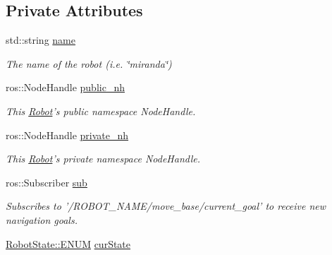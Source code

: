 \subsection*{Private Attributes}
\begin{DoxyCompactItemize}
\item 
\hypertarget{classRobot_ae11f12fef20c4252161c6b774a436f1d}{std\-::string \hyperlink{classRobot_ae11f12fef20c4252161c6b774a436f1d}{name}}\label{classRobot_ae11f12fef20c4252161c6b774a436f1d}

\begin{DoxyCompactList}\small\item\em The name of the robot (i.\-e. \char`\"{}miranda\char`\"{}) \end{DoxyCompactList}\item 
\hypertarget{classRobot_a1524dd7e0c2337ba9f64c5c128a96b7e}{ros\-::\-Node\-Handle \hyperlink{classRobot_a1524dd7e0c2337ba9f64c5c128a96b7e}{public\-\_\-nh}}\label{classRobot_a1524dd7e0c2337ba9f64c5c128a96b7e}

\begin{DoxyCompactList}\small\item\em This \hyperlink{classRobot}{Robot}'s public namespace Node\-Handle. \end{DoxyCompactList}\item 
\hypertarget{classRobot_a54967890efc1ee92e76801335fc9996b}{ros\-::\-Node\-Handle \hyperlink{classRobot_a54967890efc1ee92e76801335fc9996b}{private\-\_\-nh}}\label{classRobot_a54967890efc1ee92e76801335fc9996b}

\begin{DoxyCompactList}\small\item\em This \hyperlink{classRobot}{Robot}'s private namespace Node\-Handle. \end{DoxyCompactList}\item 
\hypertarget{classRobot_a33b4610bd0cf57a0c50a69ead78773b2}{ros\-::\-Subscriber \hyperlink{classRobot_a33b4610bd0cf57a0c50a69ead78773b2}{sub}}\label{classRobot_a33b4610bd0cf57a0c50a69ead78773b2}

\begin{DoxyCompactList}\small\item\em Subscribes to '/\-R\-O\-B\-O\-T\-\_\-\-N\-A\-M\-E/move\-\_\-base/current\-\_\-goal' to receive new navigation goals. \end{DoxyCompactList}\item 
\hypertarget{classRobot_ae619a5f25f4bfdeaba8dda29e9b68bb5}{\hyperlink{namespaceRobotState_a35861cd80d5e6a7efe93588700256f40}{Robot\-State\-::\-E\-N\-U\-M} \hyperlink{classRobot_ae619a5f25f4bfdeaba8dda29e9b68bb5}{cur\-State}}\label{classRobot_ae619a5f25f4bfdeaba8dda29e9b68bb5}


\end{DoxyCompactItemize}
